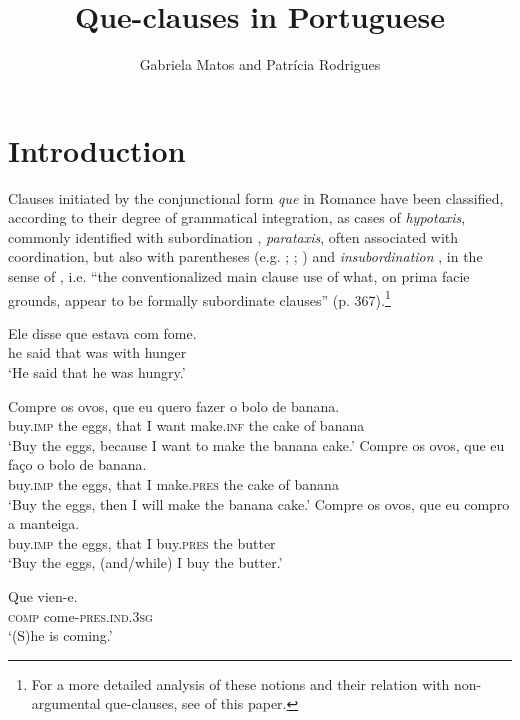 \documentclass[output=paper,colorlinks,citecolor=brown,
]{langscibook}
\author{Gabriela Matos\affiliation{ULisboa -- Universidade de Lisboa} and Patrícia Rodrigues\affiliation{UFPR -- Universidade Federal do Paraná}}
\title{Que-clauses in Portuguese}
\begin{document}
\maketitle

\section{Introduction}
Clauses initiated by the conjunctional form \textit{que} in Romance have been classified, according to their degree of grammatical integration, as cases of \textit{hypotaxis}, commonly identified with subordination , \textit{parataxis}, often associated with coordination, but also with parentheses  (e.g. \citealt{quirk_comprehensive_1985}; \citealt{de_vries_invisible_2007}; \citealt{colaco_explicative_2016}) and \textit{insubordination} , in the sense of \citet{evans_insubordination_2007}, i.e. “the conventionalized main clause use of what, on prima facie grounds, appear to be formally subordinate clauses” (p. 367).\footnote{For a more detailed analysis of these notions and their relation with non-argumental que-clauses, see  of this paper.}

\ea \label{ex:matos:fome}
\gll Ele disse que estava com fome.\\
     he said that was with hunger\\
\glt `He said that he was hungry.'
\z

\ea \label{ex:matos:ovos}
 \ea \label{ex:matos:ovos-fazer}
 \gll Compre os ovos, que eu quero fazer o bolo de banana.\\
      buy.\textsc{imp} the eggs, that I want make.\textsc{inf} the cake of banana\\
 \glt ‘Buy the eggs, because I want to make the banana cake.’ 
 \ex \label{ex:matos:ovos-faco}
 \gll Compre os ovos, que eu faço o bolo de banana.\\
      buy.\textsc{imp} the eggs, that I make.\textsc{pres} the cake of banana\\
 \glt `Buy the eggs, then I will make the banana cake.'
 \ex \label{ex:matos:ovos-manteiga}
 \gll Compre os ovos, que eu compro a manteiga.\\
      buy.\textsc{imp} the eggs, that I buy.\textsc{pres} the butter\\
 \glt ‘Buy the eggs, (and/while) I buy the butter.’ 
 \z
\z
{}

\ea \label{ex:matos:vien}
\gll Que vien-e. \\
     \textsc{comp} come-\textsc{pres}.\textsc{ind}.\textsc{3sg}\\
\glt ‘(S)he is coming.’  \citep[507]{gras_interactional_2015}
\z
{}
\end{document}
